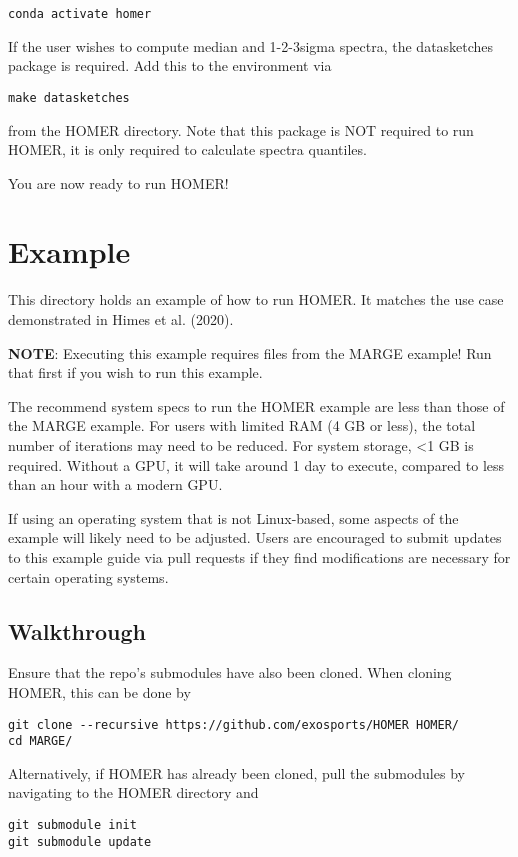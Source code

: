 \documentclass[letterpaper, 12pt]{article}
\begin{document}
\begin{verbatim}
conda activate homer
\end{verbatim}

\noindent If the user wishes to compute median and 1-2-3sigma spectra, 
the datasketches package is required.  Add this to the environment via
\begin{verbatim}
make datasketches
\end{verbatim}
\noindent from the HOMER directory. Note that this package is NOT required 
to run HOMER, it is only required to calculate spectra quantiles.

\noindent You are now ready to run HOMER!


\section{Example}
\label{sec:example}

This directory holds an example of how to run HOMER. It matches the use case 
demonstrated in Himes et al. (2020).

\noindent \textbf{NOTE}: Executing this example requires files from the 
MARGE example!  Run that first if you wish to run this example.\newline

\noindent The recommend system specs to run the HOMER example are less than 
those of the MARGE example.  For users with limited RAM (4 GB or less), the 
total number of iterations may need to be reduced.  For system storage, 
{\textless}1 GB is required.  Without a GPU, it will take around 1 day 
to execute, compared to less than an hour with a modern GPU.\newline

\noindent If using an operating system that is not Linux-based, some aspects of 
the example will likely need to be adjusted.  Users are encouraged to submit 
updates to this example guide via pull requests if they find modifications are 
necessary for certain operating systems.


\subsection{Walkthrough}

Ensure that the repo's submodules have also been cloned.  
When cloning HOMER, this can be done by
\begin{verbatim}
git clone --recursive https://github.com/exosports/HOMER HOMER/
cd MARGE/
\end{verbatim}
Alternatively, if HOMER has already been cloned, pull the submodules by 
navigating to the HOMER directory and 
\begin{verbatim}
git submodule init
git submodule update
\end{verbatim}
\end{document}
